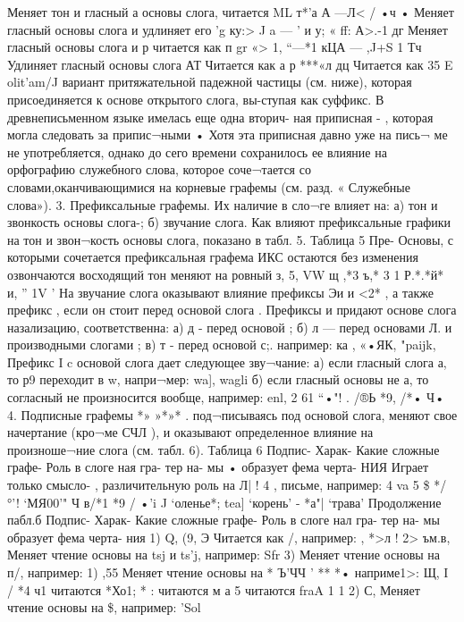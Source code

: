  Меняет тон и гласный а основы   слога, читается 
ML т*’а 
	А —Л< /	
•ч • Меняет гласный основы слога и     удлиняет его	'g ку:>
J
a	—	'
и 	 у;
« 	 ff:	А>.-1
дг Меняет гласный основы слога и	р
 читается как п	 gr «> 1,
“—*1	кЦА
— ,J+S	1
Тч	Удлиняет гласный	основы слога
АТ	Читается как а	р ***«л
дц	Читается как 35	E olit’am/J
вариант притяжательной падежной частицы (см.
ниже), которая присоединяется к основе открытого слога, вы-ступая как суффикс.
В древнеписьменном языке имелась еще одна вторич- ная приписная -	, которая могла следовать за припис¬ными	• Хотя эта приписная давно уже на пись¬
ме не употребляется, однако до сего времени сохранилось ее влияние на орфографию служебного слова, которое соче¬тается со словами,оканчивающимися на корневые графемы
(см. разд. « Служебные слова»).
3.	Префиксальные графемы. Их наличие в сло¬ге влияет на: а) тон и звонкость основы слога-; б) звучание слога. Как влияют префиксальные графики на тон и звон¬кость основы слога, показано в табл. 5.
Таблица 5
Пре- Основы, с которыми сочетается префиксальная графема
 ИКС остаются без изменения	озвончаются восходящий тон
меняют на ровный
з, 5, 	VW	щ
	 ,*3	ъ,* 	
 	3	1
	Р.*.*й*		
и,	'' 1V '
На звучание слога оказывают влияние префиксы Эи и <2* , а также префикс   , если он стоит перед основой
слога .
Префиксы и придают основе слога назализацию, соответственна: а) д - перед основой ; б) л — перед основами   Л.  и производными слогами	;
в) т - перед основой с;. например:	 ка ,
«•ЯК, "paijk,
Префикс I c основой слога дает следующее зву¬чание: а) если гласный слога а, то р9 переходит в w, напри¬мер:	wa],	wagli б) если гласный основы
не а, то согласный не произносится вообще, например:
enl, 2 61 “•"! .	/®Ь  *9, /*• Ч•
4.	Подписные графемы *» »*»* . под¬писываясь под основой слога, меняют свое начертание (кро¬ме СЧЛ ), и оказывают определенное влияние на произноше¬ние слога (см. табл. 6).
Таблица 6
Подпис- Харак- Какие сложные графе- Роль в слоге ная гра- тер на-	мы • образует
фема черта-
	НИЯ	
Играет только смысло- , различительную роль на Л|	!	4	,	письме, например:  
 	4 va   5 \$	*/°'! ‘МЯ00'" Ч в/*1
*9	/ •'i J	‘оленье*;   tea] ‘корень’
-   *а"| ‘трава’
			 Продолжение пабл.б
Подпис- Харак- Какие сложные графе-	Роль в слоге
нал гра- тер на- мы образует фема черта-
	ния			
1)	Q, (9, Э	Читается как /, например:
,	*>л
!	2>	ъм.в,	Меняет чтение основы	на
tsj и ts’j, например: Sfr
3)		Меняет чтение основы на
п/, например:
1)	  ,55 Меняет чтение основы на
*	Ъ'ЧЧ ' ** *• наприме1>:	Щ,
I / *4	ч1 читаются *Хо1;
*	:	читаются
м	а   5 читаются
	fraA 1	1	
2)	С,	Меняет чтение основы	на
\$, например:   'Sol
